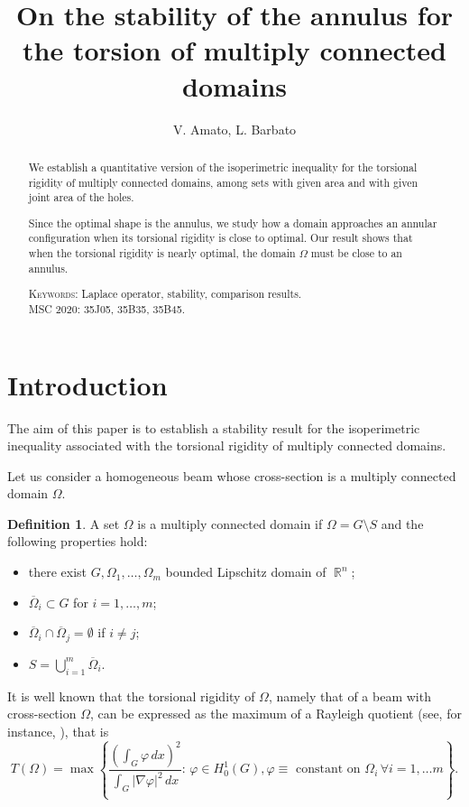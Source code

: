\documentclass[oneside,a4paper,11pt,notitlepage]{article}
\title{On the stability of the annulus for the torsion of multiply connected domains}
\author{V. Amato, L. Barbato}
\date{}
\newcommand{\abs}[1]{{\left|#1\right|}}
\theoremstyle{definition}
\newtheorem{definizione}{Definition}[section]
\theoremstyle{plain}
\theoremstyle{definition}
\DeclareMathOperator{\R}{\mathbb{R}}
\begin{document}
\maketitle
\begin{abstract}
We establish a quantitative version of the isoperimetric inequality for the torsional rigidity of multiply connected domains, among sets with
given area and with given joint area of the holes.

Since the optimal shape is the annulus, we study how a domain approaches an annular configuration when its torsional rigidity is close to optimal. Our result shows that when the torsional rigidity is nearly optimal, the domain $\Omega$ must be close to an annulus.

\medskip

\textsc{Keywords:}  Laplace operator, stability, comparison results.\\
\textsc{MSC 2020:}  35J05, 35B35, 35B45.
\end{abstract}
\section{Introduction}

The aim of this paper is to establish a stability result for the isoperimetric inequality associated with the torsional rigidity of multiply connected domains.

Let us consider a homogeneous beam whose cross-section is a multiply connected domain $\Omega$.

\begin{definizione}
    \label{multiplyconnected}
    A set $\Omega$ is a multiply connected domain if  $\Omega=G\setminus S$ and the following properties hold:
\begin{itemize}
    \item[\emph{(i)}] there exist $G,\Omega_1,\dots,\Omega_m$ bounded Lipschitz domain of $\R^n$; 
    \item[\emph{(ii)}] $\overline{\Omega}_i\subset G$ for $i=1,\dots,m$;
    \item[\emph{(iii)}]$\overline{\Omega}_i\cap\overline{\Omega}_j=\emptyset$ if $i\neq j$;
    \item[\emph{(iv)}]$S=\bigcup\limits_{i=1}^m\overline{\Omega}_i$.    
\end{itemize}
\end{definizione}

It is well known that the torsional rigidity of $\Omega$, namely that of a beam with cross-section $\Omega$, can be expressed as the maximum of a Rayleigh quotient (see, for instance, \cite{B,PW}), that is
\begin{equation}\label{torsione}
    T(\Omega)= \max\left\{ \frac{\displaystyle \left(\int_G \varphi\, dx\right)^2}{\displaystyle \int_G\abs{\nabla\varphi}^2\,dx} : \, \varphi \in H^1_0(G), \varphi\equiv \text{ constant on }  \Omega_i \, \forall i=1, \dots m  \right\}.
\end{equation}
\end{document}
